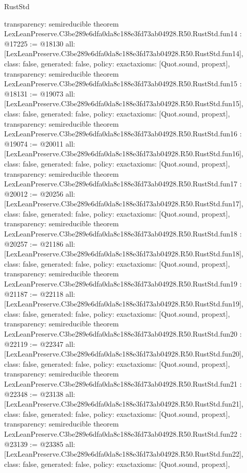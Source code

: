 \begin{lexlean}{RustStd}
\begin{coremodule}
{  transparency: semireducible
}
theorem LexLeanPreserve.C3be289e6dfa0da8c188e3fd73ab04928.R50.RustStd.fun14 : @17225 := @18130 {
  all: [LexLeanPreserve.C3be289e6dfa0da8c188e3fd73ab04928.R50.RustStd.fun14],
  class: false,
  generated: false,
  policy: exact{axioms: [Quot.sound, propext]},
  transparency: semireducible
}
theorem LexLeanPreserve.C3be289e6dfa0da8c188e3fd73ab04928.R50.RustStd.fun15 : @18131 := @19073 {
  all: [LexLeanPreserve.C3be289e6dfa0da8c188e3fd73ab04928.R50.RustStd.fun15],
  class: false,
  generated: false,
  policy: exact{axioms: [Quot.sound, propext]},
  transparency: semireducible
}
theorem LexLeanPreserve.C3be289e6dfa0da8c188e3fd73ab04928.R50.RustStd.fun16 : @19074 := @20011 {
  all: [LexLeanPreserve.C3be289e6dfa0da8c188e3fd73ab04928.R50.RustStd.fun16],
  class: false,
  generated: false,
  policy: exact{axioms: [Quot.sound, propext]},
  transparency: semireducible
}
theorem LexLeanPreserve.C3be289e6dfa0da8c188e3fd73ab04928.R50.RustStd.fun17 : @20012 := @20256 {
  all: [LexLeanPreserve.C3be289e6dfa0da8c188e3fd73ab04928.R50.RustStd.fun17],
  class: false,
  generated: false,
  policy: exact{axioms: [Quot.sound, propext]},
  transparency: semireducible
}
theorem LexLeanPreserve.C3be289e6dfa0da8c188e3fd73ab04928.R50.RustStd.fun18 : @20257 := @21186 {
  all: [LexLeanPreserve.C3be289e6dfa0da8c188e3fd73ab04928.R50.RustStd.fun18],
  class: false,
  generated: false,
  policy: exact{axioms: [Quot.sound, propext]},
  transparency: semireducible
}
theorem LexLeanPreserve.C3be289e6dfa0da8c188e3fd73ab04928.R50.RustStd.fun19 : @21187 := @22118 {
  all: [LexLeanPreserve.C3be289e6dfa0da8c188e3fd73ab04928.R50.RustStd.fun19],
  class: false,
  generated: false,
  policy: exact{axioms: [Quot.sound, propext]},
  transparency: semireducible
}
theorem LexLeanPreserve.C3be289e6dfa0da8c188e3fd73ab04928.R50.RustStd.fun20 : @22119 := @22347 {
  all: [LexLeanPreserve.C3be289e6dfa0da8c188e3fd73ab04928.R50.RustStd.fun20],
  class: false,
  generated: false,
  policy: exact{axioms: [Quot.sound, propext]},
  transparency: semireducible
}
theorem LexLeanPreserve.C3be289e6dfa0da8c188e3fd73ab04928.R50.RustStd.fun21 : @22348 := @23138 {
  all: [LexLeanPreserve.C3be289e6dfa0da8c188e3fd73ab04928.R50.RustStd.fun21],
  class: false,
  generated: false,
  policy: exact{axioms: [Quot.sound, propext]},
  transparency: semireducible
}
theorem LexLeanPreserve.C3be289e6dfa0da8c188e3fd73ab04928.R50.RustStd.fun22 : @23139 := @23385 {
  all: [LexLeanPreserve.C3be289e6dfa0da8c188e3fd73ab04928.R50.RustStd.fun22],
  class: false,
  generated: false,
  policy: exact{axioms: [Quot.sound, propext]},
}
\end{coremodule}
\end{lexlean}
